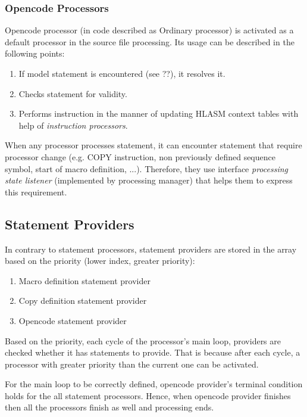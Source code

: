 \subsubsection{Opencode Processors}

Opencode processor (in code described as Ordinary processor) is activated as a default processor in the source file processing. Its usage can be described in the following points:
\begin{enumerate}
	\item If model statement is encountered (see ??), it resolves it.
	\item Checks statement for validity.
	\item Performs instruction in the manner of updating HLASM context tables with help of \emph{instruction processors}.
\end{enumerate}

\vspace{0.5cm}

When any processor processes statement, it can encounter statement that require processor change (e.g. COPY instruction, non previously defined sequence symbol, start of macro definition, ...). Therefore, they use interface \emph{processing state listener} (implemented by processing manager) that helps them to express this requirement.

\subsection{Statement Providers}

In contrary to statement processors, statement providers are stored in the array based on the priority (lower index, greater priority):

\begin{enumerate}
	\item Macro definition statement provider
	\item Copy definition statement provider
	\item Opencode statement provider
\end{enumerate}

Based on the priority, each cycle of the processor's main loop, providers are checked whether it has statements to provide. That is because after each cycle, a processor with greater priority than the current one can be activated. 

For the main loop to be correctly defined, opencode provider's terminal condition holds for the all statement processors. Hence, when opencode provider finishes then all the processors finish as well and processing ends.

